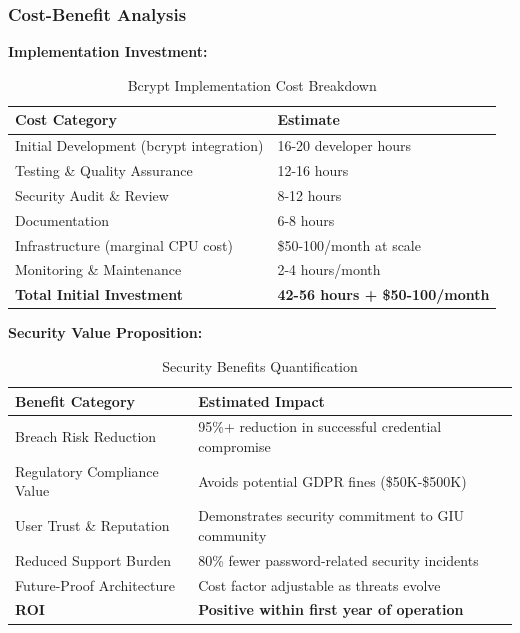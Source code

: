 \documentclass[12pt,a4paper]{article}
\begin{document}
\subsubsection{Cost-Benefit Analysis}

\textbf{Implementation Investment:}

\begin{table}[H]
\centering
\begin{tabular}{|p{6cm}|p{6cm}|}
\hline
\textbf{Cost Category} & \textbf{Estimate} \\
\hline
Initial Development (bcrypt integration) & 16-20 developer hours \\
\hline
Testing \& Quality Assurance & 12-16 hours \\
\hline
Security Audit \& Review & 8-12 hours \\
\hline
Documentation & 6-8 hours \\
\hline
Infrastructure (marginal CPU cost) & \$50-100/month at scale \\
\hline
Monitoring \& Maintenance & 2-4 hours/month \\
\hline
\textbf{Total Initial Investment} & \textbf{42-56 hours + \$50-100/month} \\
\hline
\end{tabular}
\caption{Bcrypt Implementation Cost Breakdown}
\end{table}

\vspace{0.5em}

\textbf{Security Value Proposition:}

\begin{table}[H]
\centering
\begin{tabular}{|p{6cm}|p{6cm}|}
\hline
\textbf{Benefit Category} & \textbf{Estimated Impact} \\
\hline
Breach Risk Reduction & 95\%+ reduction in successful credential compromise \\
\hline
Regulatory Compliance Value & Avoids potential GDPR fines (\$50K-\$500K) \\
\hline
User Trust \& Reputation & Demonstrates security commitment to GIU community \\
\hline
Reduced Support Burden & 80\% fewer password-related security incidents \\
\hline
Future-Proof Architecture & Cost factor adjustable as threats evolve \\
\hline
\textbf{ROI} & \textbf{Positive within first year of operation} \\
\hline
\end{tabular}
\caption{Security Benefits Quantification}
\end{table}
\end{document}
